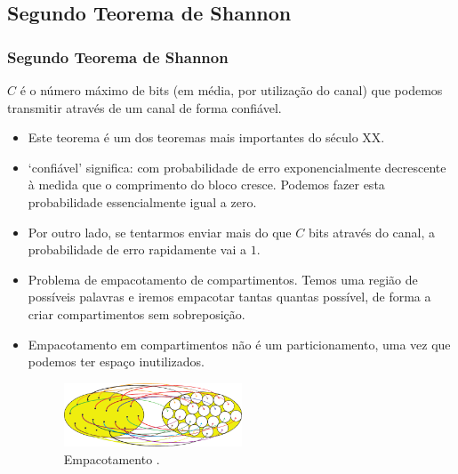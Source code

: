 \subsection{Segundo Teorema de Shannon}
\begin{frame}[allowframebreaks]
  \frametitle{Segundo Teorema de Shannon}

  \begin{theorem}
  $C$ é o número máximo de bits (em média, por utilização do canal) que podemos transmitir
  através de um canal de forma confiável.
  \end{theorem}

  \begin{itemize}
  \item Este teorema é um dos teoremas mais importantes do século XX.
  \item `confiável' significa: com probabilidade de erro exponencialmente decrescente à medida que
	o comprimento do bloco cresce. Podemos fazer esta probabilidade essencialmente igual a zero.
  \item Por outro lado, se tentarmos enviar mais do que $C$ bits através do canal, a probabilidade 
	de erro rapidamente vai a $1$.
  \item Problema de empacotamento de compartimentos. Temos uma região de possíveis palavras e 
	iremos empacotar tantas quantas possível, de forma a criar compartimentos sem sobreposição. 
  \item Empacotamento em compartimentos não é um particionamento, uma vez que podemos ter espaço inutilizados. 

                \begin{figure}[h!]
                \centering
                \includegraphics[width=0.5\textwidth]{images/binpack.pdf}
		\caption{Empacotamento \citep{bilmes2013}.}
                \label{fig:binpack}
                \end{figure}


\end{itemize}
\end{frame}
